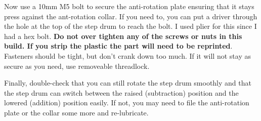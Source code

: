 \documentclass{article}
\begin{document}
Now use a 10mm M5 bolt to secure the anti-rotation plate ensuring that it stays press against the
ant-rotation collar. If you need to, you can put a driver through the hole at the top of the step
drum to reach the bolt. I used plier for this since I had a hex bolt. \textbf{Do not over tighten
any of the screws or nuts in this build. If you strip the plastic the part will need to be reprinted}.
Fasteners should be tight, but don't crank down too much. If it will not stay as secure as you need,
use removeable threadlock.

Finally, double-check that you can still rotate the step drum smoothly and that the step drum can
switch between the raised (subtraction) position and the lowered (addition) position easily. If not,
you may need to file the anti-rotation plate or the collar some more and re-lubricate.
\end{document}
